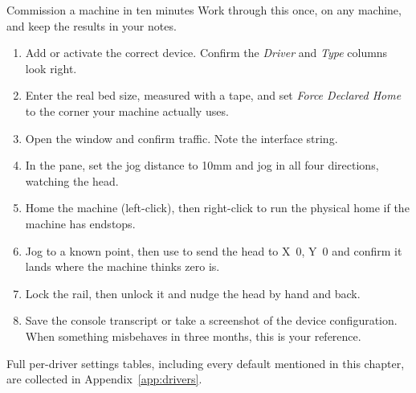 \begin{tryit}{Commission a machine in ten minutes}
Work through this once, on any machine, and keep the results in your notes.
\begin{enumerate}[label=\arabic*.,leftmargin=1.4em]
  \item Add or activate the correct device. Confirm the \emph{Driver} and
        \emph{Type} columns look right.
  \item Enter the real bed size, measured with a tape, and set \emph{Force
        Declared Home} to the corner your machine actually uses.
  \item Open the  window and confirm traffic. Note the interface
        string.
  \item In the  pane, set the jog distance to 10\unit{mm} and jog in
        all four directions, watching the head.
  \item Home the machine (left-click), then right-click to run the physical home
        if the machine has endstops.
  \item Jog to a known point, then use  to send the head to
        X~0, Y~0 and confirm it lands where the machine thinks zero is.
  \item Lock the rail, then unlock it and nudge the head by hand and back.
  \item Save the console transcript or take a screenshot of the device
        configuration. When something misbehaves in three months, this is your
        reference.
\end{enumerate}
\end{tryit}

\noindent Full per-driver settings tables, including every default mentioned in
this chapter, are collected in Appendix~\ref{app:drivers}.
